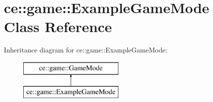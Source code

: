 \hypertarget{classce_1_1game_1_1_example_game_mode}{}\section{ce\+:\+:game\+:\+:Example\+Game\+Mode Class Reference}
\label{classce_1_1game_1_1_example_game_mode}
Inheritance diagram for ce\+:\+:game\+:\+:Example\+Game\+Mode\+:\begin{figure}[H]
\begin{center}
\leavevmode
\includegraphics[height=2.000000cm]{classce_1_1game_1_1_example_game_mode}
\end{center}
\end{figure}
